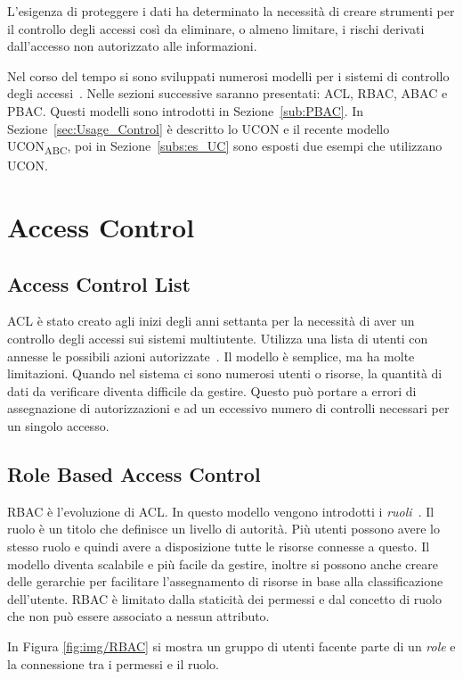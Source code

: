 \label{chap:Access Control e Usage Control}
L'esigenza di proteggere i dati ha determinato la necessità di creare strumenti per il controllo degli accessi così da eliminare,
 o almeno limitare, i rischi derivati dall'accesso non autorizzato alle informazioni.\par
Nel corso del tempo si sono sviluppati numerosi modelli per i sistemi di controllo degli accessi~\cite{NISTACM}.
Nelle sezioni successive saranno presentati:
\ac{ACL}, \ac{RBAC}, \ac{ABAC} e \ac{PBAC}. Questi modelli sono introdotti in Sezione~\ref{sub:PBAC}.
In Sezione~\ref{sec:Usage_Control} è descritto lo \ac{UCON} e il recente modello UCON\textsubscript{ABC}, poi in Sezione~\ref{subs:es_UC}
sono esposti due esempi che utilizzano \ac{UCON}.
\section{Access Control}

\subsection*{Access Control List}
\label{sub:ACL}
\ac{ACL} è stato creato agli inizi degli anni settanta per la necessità di aver un controllo degli
accessi sui sistemi multiutente.
Utilizza una lista di utenti con annesse le possibili azioni autorizzate~\cite{ACL}. Il modello è semplice,
ma ha molte limitazioni. Quando nel sistema ci sono numerosi utenti o risorse, la quantità di dati da verificare diventa
difficile da gestire. Questo può portare a errori di assegnazione di autorizzazioni e ad un eccessivo numero di controlli
necessari per un singolo accesso.
\subsection*{Role Based Access Control}
\label{sub:RBAC}
\ac{RBAC} è l'evoluzione di \ac{ACL}. In questo modello vengono introdotti i \emph{ruoli}~\cite{RBAC}.
Il ruolo è un titolo che definisce un livello di autorità. Più utenti
possono avere lo stesso ruolo e quindi avere a disposizione tutte le risorse connesse a questo. Il modello
diventa scalabile e più facile da gestire, inoltre si possono anche creare delle gerarchie per facilitare l'assegnamento di
risorse in base alla classificazione dell'utente. \ac{RBAC} è limitato dalla staticità dei permessi e dal concetto di ruolo
che non può essere associato a nessun attributo.
\par In Figura \ref{fig:img/RBAC} si mostra un gruppo di utenti
facente parte di un \emph{role} e la connessione tra i permessi e il ruolo.
